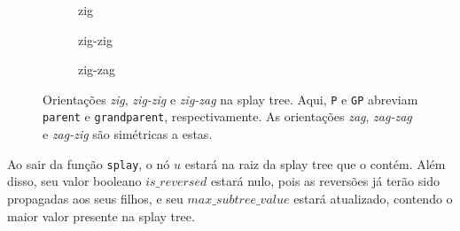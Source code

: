 \begin{figure}[H]
    \centering
    \begin{subfigure}[b]{0.3\textwidth}
        \centering
        \caption{zig}
    \end{subfigure}
    \hfill
    \begin{subfigure}[b]{0.3\textwidth}
        \centering
        \caption{zig-zig}
    \end{subfigure}
    \hfill
    \begin{subfigure}[b]{0.3\textwidth}
        \centering
        \caption{zig-zag}
    \end{subfigure}
    \caption{Orientações \textit{zig}, \textit{zig-zig} e \textit{zig-zag} na splay tree. Aqui, \texttt{P} e \texttt{GP} abreviam \texttt{parent} e \texttt{grandparent}, respectivamente. As orientações  \textit{zag}, \textit{zag-zag} e \textit{zag-zig} são simétricas a estas.}
    \label{fig:zig-oris}
\end{figure}


Ao sair da função \texttt{splay}, o nó $u$ estará na raiz da splay tree que o contém. Além disso, seu valor booleano $is\_reversed$ estará nulo, pois as reversões já terão sido propagadas aos seus filhos, e seu $max\_subtree\_value$ estará atualizado, contendo o maior valor presente na splay tree.

